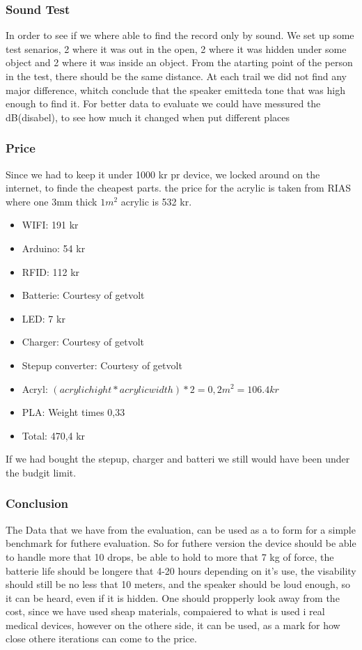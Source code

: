 \subsubsection{Sound Test}
In order to see if we where able to find the record only by sound.
We set up some test senarios, 2 where it was out in the open, 2 where it was hidden under some object and 2 where it was inside an object. From the atarting point of the person in the test, there should be the same distance.
At each trail we did not find any major difference, whitch conclude that the speaker emitteda tone that was high enough to find it.
For better data to evaluate we could have messured the dB(disabel), to see how much it changed when put different places

\subsubsection{Price}
Since we had to keep it under 1000 kr pr device, we locked around on the internet, to finde the cheapest parts.
the price for the acrylic is taken from RIAS \cite{RIAS} where one 3mm thick $1 m^2$ acrylic is 532 kr.
\begin{itemize} \itemsep0em
	 \item WIFI: 191 kr \cite{Adafruit}
	 \item Arduino: 54 kr \cite{Sparkfun}
	 \item RFID: 112 kr \cite{Let-Eletronik}
	 \item Batterie: Courtesy of getvolt  \cite{Getvolt}
	 \item LED: 7 kr \cite{Adafruit}
	 \item Charger: Courtesy of getvolt \cite{Getvolt}
	 \item Stepup converter: Courtesy of getvolt  \cite{Getvolt}
	 \item Acryl: $(acrylic hight * acrylic width)*2 = 0,2 m^2 = 106.4 kr $ \cite{RIAS}
	 \item PLA: Weight times 0,33 
	 \item Total: 470,4 kr
\end{itemize}
If we had bought the stepup, charger and batteri we still would have been under the budgit limit.

\subsubsection{Conclusion}
The Data that we have from the evaluation, can be used as a to form for a simple benchmark for futhere evaluation.
So for futhere version the device should be able to handle more that 10 drops, be able to hold to more that 7 kg of force, the batterie life should be longere that 4-20 hours depending on it's use, the visability should still be no less that 10 meters, and the speaker should be loud enough, so it can be heard, even if it is hidden.
One should propperly look away from the cost, since we have used sheap materials, compaiered to what is used i real medical devices, however on the othere side, it can be used, as a mark for how close othere iterations can come to the price.